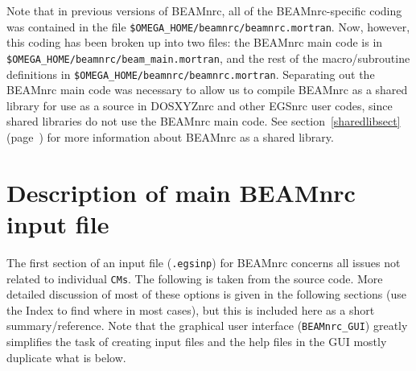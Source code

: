 \documentclass[12pt,twoside]{article}
\begin{document}
Note that in previous versions of BEAMnrc, all of the BEAMnrc-specific
coding was contained in the file {\tt \$OMEGA\_HOME/beamnrc/beamnrc.mortran}.
Now, however, this coding has been broken up into two files: the
BEAMnrc main code is in \\{\tt \$OMEGA\_HOME/beamnrc/beam\_main.mortran}, and
the rest of the macro/subroutine definitions in
{\tt \$OMEGA\_HOME/beamnrc/beamnrc.mortran}.  Separating out the BEAMnrc
main code was necessary to allow us to compile BEAMnrc as a shared
library for use as a source in DOSXYZnrc and other EGSnrc user codes,
since shared libraries do not use the BEAMnrc main code.
See section~\ref{sharedlibsect} (page~\pageref{sharedlibsect}) for more
information about BEAMnrc as a shared library.

\section{Description of main BEAMnrc input file}
\label{dmbif}
The first section of an input file (\verb+.egsinp+) for BEAMnrc concerns
all issues not related to individual \verb+CMs+.  The following is taken
from the source code. More detailed discussion of most of these options
is given in the following sections (use the Index to find where in most
cases), but this is included here as a short summary/reference. Note that
the graphical user interface ({\tt BEAMnrc\_GUI}) greatly
simplifies the task of creating input files\cite{TR99} and the help files
in the GUI mostly duplicate what is below.
 
\end{document}
